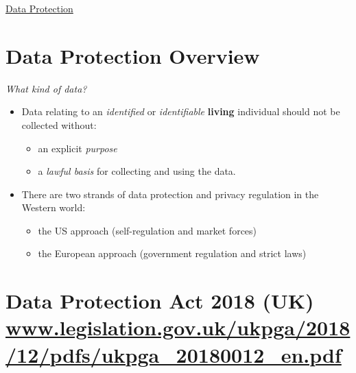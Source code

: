 \documentclass{article}
\begin{document}
\begin{center}
	\underline{\huge Data Protection}
\end{center}

\section{Data Protection Overview}

{\em What kind of data?}
\bigskip
\begin{itemize}
\item Data relating to an {\em identified} or {\em identifiable} {\bf living} individual should not be collected without:
\begin{itemize}
\item an explicit {\em purpose}
\item a {\em lawful basis} for collecting and using the data.
\end{itemize}
\end{itemize}


\bigskip
\begin{itemize}
\item There are two strands of data protection and privacy regulation in the Western world: 
\begin{itemize}
\item the US approach (self-regulation and market forces)
\item the European approach (government regulation and strict laws)
\end{itemize}
\end{itemize}



\section{Data Protection Act 2018 (UK)
\small \href{http://www.legislation.gov.uk/ukpga/2018/12/pdfs/ukpga_20180012_en.pdf}{www.legislation.gov.uk/ukpga/2018/12/pdfs/ukpga\_20180012\_en.pdf}}
\end{document}
